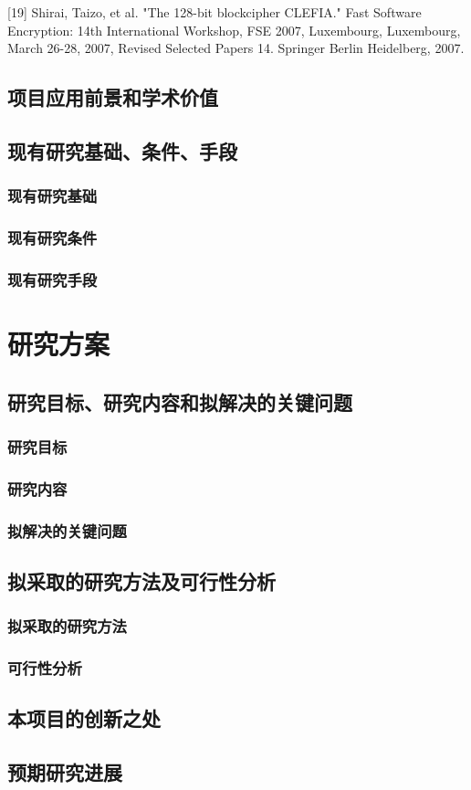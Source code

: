 \documentclass{ctexart}
\begin{document}
[19] Shirai, Taizo, et al. "The 128-bit blockcipher CLEFIA." Fast Software Encryption: 14th International Workshop, FSE 2007, Luxembourg, Luxembourg, March 26-28, 2007, Revised Selected Papers 14. Springer Berlin Heidelberg, 2007.



\subsection{项目应用前景和学术价值}
\subsection{现有研究基础、条件、手段}
\subsubsection{现有研究基础}
\subsubsection{现有研究条件}
\subsubsection{现有研究手段}

\section{研究方案}
\subsection{研究目标、研究内容和拟解决的关键问题}
\subsubsection{研究目标}
\subsubsection{研究内容}
\subsubsection{拟解决的关键问题}
\subsection{拟采取的研究方法及可行性分析}
\subsubsection{拟采取的研究方法}
\subsubsection{可行性分析}

\subsection{本项目的创新之处}
\subsection{预期研究进展}
\end{document}
